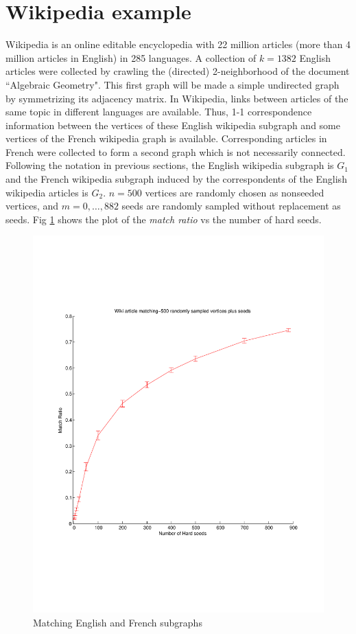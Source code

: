\documentclass[12pt]{article}
\begin{document}
\section{Wikipedia example \label{wiki}}
Wikipedia is an online editable encyclopedia with 22 million articles (more than 4 million articles in English) in 285 languages. A collection of $k=1382$ English articles were collected by crawling the (directed) 2-neighborhood of the document ``Algebraic Geometry". This first graph will be made a simple undirected graph by symmetrizing its adjacency matrix.   In Wikipedia, links between articles of the same topic  in different languages are  available.   Thus, 1-1 correspondence information between the vertices of these English wikipedia subgraph and some vertices of the French wikipedia graph is available. Corresponding articles in French  were collected to form a second graph which is not necessarily connected. Following the notation in previous sections, the English wikipedia subgraph is $G_1$ and the  French  wikipedia subgraph induced by the correspondents of the English wikipedia articles is $G_2$. $n=500$ vertices are randomly chosen as nonseeded vertices, and $m=0,\ldots, 882$ seeds are randomly sampled without replacement as seeds. Fig \ref{Wiki-fig-1} shows the plot of the \emph{match ratio} vs the number of hard seeds.
\begin{figure}
\centering
\includegraphics[scale=0.8]{wiki}
\caption{Matching English and French subgraphs \label{Wiki-fig-1}  }
\end{figure}
\end{document}
